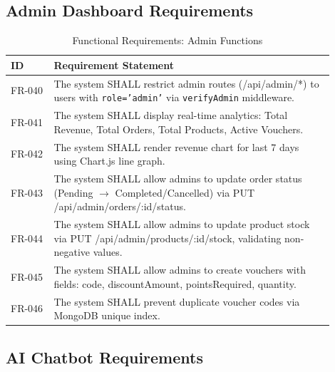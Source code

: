 \documentclass[12pt, a4paper]{report}
\begin{document}
\subsection{Admin Dashboard Requirements}

\begin{table}[H]
\centering
\caption{Functional Requirements: Admin Functions}
\label{tab:fr_admin}
\small
\begin{tabular}{@{}p{0.12\linewidth}p{0.78\linewidth}@{}}
\toprule
\textbf{ID} & \textbf{Requirement Statement} \\
\midrule
FR-040 & The system SHALL restrict admin routes (/api/admin/*) to users with \texttt{role='admin'} via \texttt{verifyAdmin} middleware. \\
FR-041 & The system SHALL display real-time analytics: Total Revenue, Total Orders, Total Products, Active Vouchers. \\
FR-042 & The system SHALL render revenue chart for last 7 days using Chart.js line graph. \\
FR-043 & The system SHALL allow admins to update order status (Pending $\rightarrow$ Completed/Cancelled) via PUT /api/admin/orders/:id/status. \\
FR-044 & The system SHALL allow admins to update product stock via PUT /api/admin/products/:id/stock, validating non-negative values. \\
FR-045 & The system SHALL allow admins to create vouchers with fields: code, discountAmount, pointsRequired, quantity. \\
FR-046 & The system SHALL prevent duplicate voucher codes via MongoDB unique index. \\
\bottomrule
\end{tabular}
\end{table}

\subsection{AI Chatbot Requirements}
\end{document}
